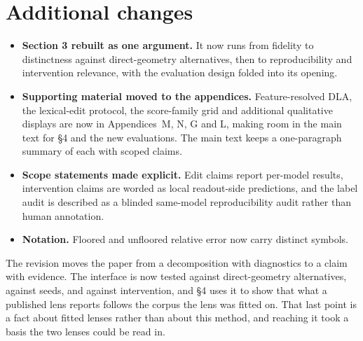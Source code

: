 \documentclass[11pt]{article}
\begin{document}
\section{Additional changes}

\begin{itemize}
\item \textbf{Section 3 rebuilt as one argument.} It now runs from fidelity
to distinctness against direct-geometry alternatives, then to reproducibility
and intervention relevance, with the evaluation design folded into its
opening.
\item \textbf{Supporting material moved to the appendices.} Feature-resolved
DLA, the lexical-edit protocol, the score-family grid and additional
qualitative displays are now in Appendices~M, N, G and L, making room in the
main text for \S4 and the new evaluations. The main text keeps a
one-paragraph summary of each with scoped claims.
\item \textbf{Scope statements made explicit.} Edit claims report per-model
results, intervention claims are worded as local readout-side predictions,
and the label audit is described as a blinded same-model reproducibility
audit rather than human annotation.
\item \textbf{Notation.} Floored and unfloored relative error now carry
distinct symbols.
\end{itemize}

The revision moves the paper from a decomposition with diagnostics to a claim
with evidence. The interface is now tested against direct-geometry
alternatives, against seeds, and against intervention, and \S4 uses it to
show that what a published lens reports follows the corpus the lens was
fitted on. That last point is a fact about fitted lenses rather than
about this method, and reaching it took a basis the two lenses could be read
in.
\end{document}
